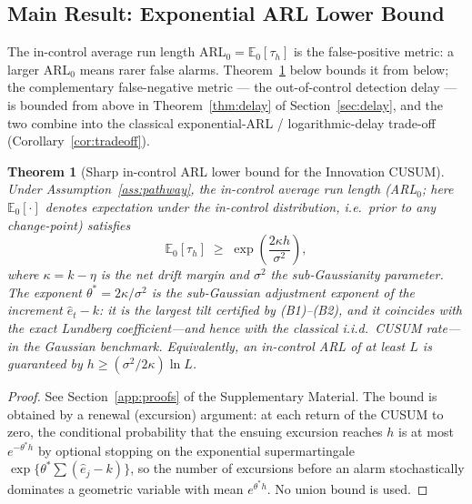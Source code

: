 \documentclass[bj,authoryear]{imsart}
\theoremstyle{plain}
\newtheorem{theorem}{Theorem}[section]
\theoremstyle{definition}
\newcommand{\E}{\mathbb{E}}
\begin{document}
\subsection{Main Result: Exponential ARL Lower Bound}

The in-control average run length ARL$_0=\E_0[\tau_h]$ is the false-positive
metric: a larger ARL$_0$ means rarer false alarms.  Theorem~\ref{thm:arl}
below bounds it from below; the complementary false-negative metric --- the
out-of-control detection delay --- is bounded from above in
Theorem~\ref{thm:delay} of Section~\ref{sec:delay}, and the two combine into
the classical exponential-ARL / logarithmic-delay trade-off
(Corollary~\ref{cor:tradeoff}).

\begin{theorem}[Sharp in-control ARL lower bound for the Innovation CUSUM]
\label{thm:arl}
  Under Assumption~\ref{ass:pathway}, the in-control average run length
  (ARL$_0$; here $\E_0[\cdot]$ denotes expectation under the in-control
  distribution, i.e.\ prior to any change-point) satisfies
  \begin{equation}
    \E_0[\tau_h]
    \;\geq\; \exp\!\left(\frac{2\kappa h}{\sigma^2}\right),
    \label{eq:arl-lb}
  \end{equation}
  where $\kappa=k-\eta$ is the net drift margin and $\sigma^2$ the
  sub-Gaussianity parameter.  The exponent $\theta^\ast=2\kappa/\sigma^2$ is the
  \emph{sub-Gaussian adjustment exponent} of the increment $\hat e_t-k$: it is
  the largest tilt certified by (B1)--(B2), and it coincides with the exact
  Lundberg coefficient---and hence with the classical i.i.d.\ CUSUM rate---in
  the Gaussian benchmark.  Equivalently, an
  in-control ARL of at least $L$ is guaranteed by
  $h\geq (\sigma^2/2\kappa)\ln L$.
\end{theorem}

\begin{proof}
  See Section~\ref{app:proofs} of the Supplementary Material.  The bound is
  obtained by a renewal (excursion) argument: at each return of the CUSUM to
  zero, the conditional probability that the ensuing excursion reaches $h$ is
  at most $e^{-\theta^\ast h}$ by optional stopping on the exponential
  supermartingale $\exp\{\theta^\ast\sum(\hat e_j-k)\}$, so the number of
  excursions before an alarm stochastically dominates a geometric variable
  with mean $e^{\theta^\ast h}$.  No union bound is used.
\end{proof}
\end{document}
